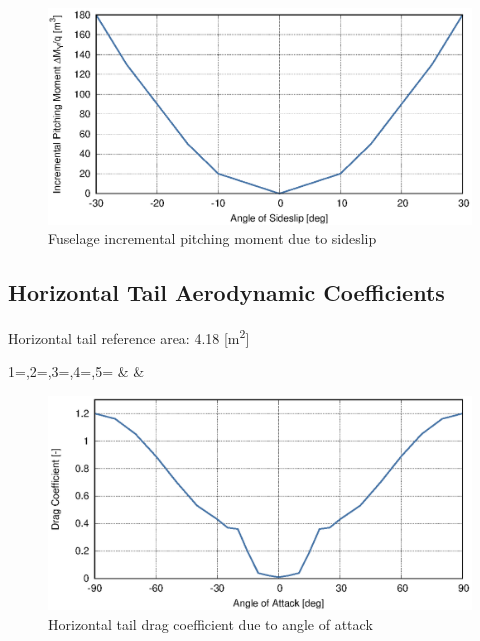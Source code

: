 \begin{figure}
  \centering
  \includegraphics[width=140mm]{eps/uh60_fuselage_beta_dcm.eps}
  \caption{Fuselage incremental pitching moment due to sideslip \cite{NASA-CR-166309}}
\end{figure}

\clearpage
\subsection{Horizontal Tail Aerodynamic Coefficients}

Horizontal tail reference area: 4.18 [m\textsuperscript{2}]

{1=\colaoa,2=\colhcx,3=\colhcz,4=\colvcx,5=\colvcy}
{\colaoa & \colhcx & \colhcz}

\begin{figure}
  \centering
  \includegraphics[width=140mm]{eps/uh60_stab_h_cx.eps}
  \caption{Horizontal tail drag coefficient due to angle of attack \cite{NASA-CR-166309}}
\end{figure}

